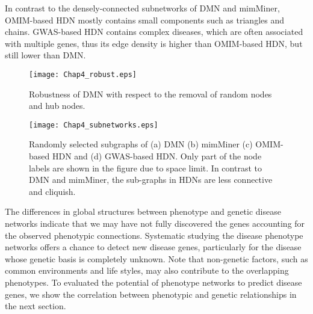 In contrast to the densely-connected subnetworks of DMN and mimMiner,
OMIM-based HDN mostly contains small components such as triangles and chains.
GWAS-based HDN contains complex diseases, which are often associated with multiple genes,
thus its edge density is higher than OMIM-based HDN, but still lower than DMN.
\begin{figure}[h!]
  \begin{center}
  \vspace{-3cm}
\texttt{[image: Chap4\_robust.eps]}
\end{center}
  \vspace{-3cm}
\caption{Robustness of DMN with respect to the removal of random nodes and hub nodes.}\label{robust}
\end{figure}
\begin{figure}[h!]
  \begin{center}
\texttt{[image: Chap4\_subnetworks.eps]}
\end{center}
\caption{Randomly selected subgraphs of (a) DMN (b) mimMiner (c) OMIM-based HDN and (d) GWAS-based HDN.
       Only part of the node labels are shown in the figure due to space limit. In contrast to DMN and mimMiner, the sub-graphs in HDNs are less connective and cliquish.}\label{subgraph}
\end{figure}

The differences in global structures between phenotype and genetic
disease networks indicate that we may have not fully discovered the genes
accounting for the observed phenotypic connections.
Systematic studying the disease phenotype networks offers a chance to detect new disease genes,
particularly for the disease whose genetic basis is completely unknown.
Note that non-genetic factors, such as common environments and life styles,
may also contribute to the overlapping phenotypes.
To evaluated the potential of phenotype networks to predict disease genes,
we show the correlation between phenotypic and genetic relationships
in the next section.

